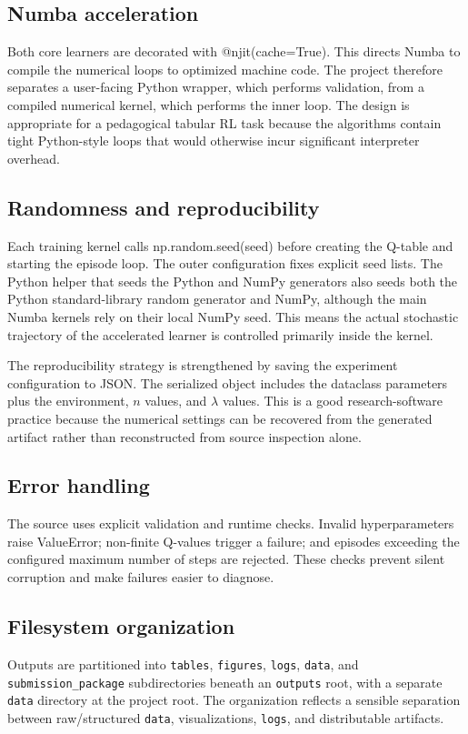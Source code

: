 \documentclass[11pt,a4paper]{article}
\begin{document}
\subsection{Numba acceleration}
Both core learners are decorated with @njit(cache=True). This directs Numba to compile the numerical loops to optimized machine code. The project therefore separates a user-facing Python wrapper, which performs validation, from a compiled numerical kernel, which performs the inner loop. The design is appropriate for a pedagogical tabular RL task because the algorithms contain tight Python-style loops that would otherwise incur significant interpreter overhead.

\subsection{Randomness and reproducibility}
Each training kernel calls np.random.seed(seed) before creating the Q-table and starting the episode loop. The outer configuration fixes explicit seed lists. The Python helper that seeds the Python and NumPy generators also seeds both the Python standard-library random generator and NumPy, although the main Numba kernels rely on their local NumPy seed. This means the actual stochastic trajectory of the accelerated learner is controlled primarily inside the kernel.

The reproducibility strategy is strengthened by saving the experiment configuration to JSON. The serialized object includes the dataclass parameters plus the environment, $n$ values, and $\lambda$ values. This is a good research-software practice because the numerical settings can be recovered from the generated artifact rather than reconstructed from source inspection alone.

\subsection{Error handling}
The source uses explicit validation and runtime checks. Invalid hyperparameters raise ValueError; non-finite Q-values trigger a failure; and episodes exceeding the configured maximum number of steps are rejected. These checks prevent silent corruption and make failures easier to diagnose.

\subsection{Filesystem organization}
Outputs are partitioned into \texttt{tables}, \texttt{figures}, \texttt{logs}, \texttt{data}, and \texttt{submission\_package} subdirectories beneath an \texttt{outputs} root, with a separate \texttt{data} directory at the project root. The organization reflects a sensible separation between raw/structured \texttt{data}, visualizations, \texttt{logs}, and distributable artifacts.
\end{document}
